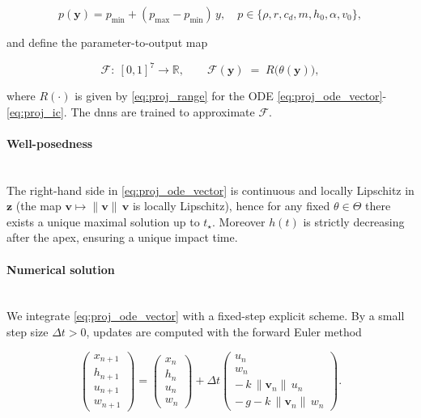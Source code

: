 \begin{equation*}
p(\mathbf y)=p_{\min}+(p_{\max}-p_{\min})\,y,\quad
p\in\{\rho,r,c_d,m,h_0,\alpha,v_0\},
\end{equation*}

and define the parameter-to-output map

\begin{equation}
\label{eq:param_to_output}
\mathcal{F}:\ [0,1]^7\to\mathbb{R},\qquad
\mathcal{F}(\mathbf y)\;=\;R\bigl(\theta(\mathbf y)\bigr),
\end{equation}

where $R(\cdot)$ is given by \eqref{eq:proj_range} for the ODE
\eqref{eq:proj_ode_vector}-\eqref{eq:proj_ic}. The \acp{dnn} are trained to
approximate $\mathcal{F}$.

\paragraph{Well-posedness} \ \\
The right-hand side in \eqref{eq:proj_ode_vector} is continuous and locally
Lipschitz in $\mathbf z$ (the map $\mathbf v\mapsto \|\mathbf v\|\,\mathbf v$ is
locally Lipschitz), hence for any fixed $\theta\in\Theta$ there exists a unique
maximal solution up to $t_\star$. Moreover $h(t)$ is strictly decreasing after
the apex, ensuring a unique impact time.

\paragraph{Numerical solution} \ \\
We integrate \eqref{eq:proj_ode_vector} with a fixed-step explicit scheme. By a
small step size $\Delta t>0$, updates are computed with the forward Euler
method

\begin{equation*}
\begin{pmatrix}
x_{n+1}\\
h_{n+1}\\
u_{n+1}\\
w_{n+1}
\end{pmatrix}
=
\begin{pmatrix}
x_n\\
h_n\\
u_n\\
w_n
\end{pmatrix}
+
\Delta t
\begin{pmatrix}
u_n\\
w_n\\
-\,k\,\|\mathbf{v}_n\|\,u_n\\
-\,g - k\,\|\mathbf{v}_n\|\,w_n
\end{pmatrix}.
\end{equation*}

